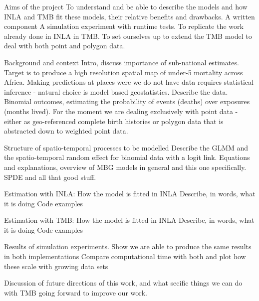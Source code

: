 \documentclass[12pt]{article}
\begin{document}
\maketitle

\begin{outline}[enumerate]
   \1 Aims of the project
      \2 To understand and be able to describe the models and how INLA and TMB fit these models, their relative benefits and drawbacks.
        \3 A written component
        \3 A simulation experiment with runtime tests. 
      \2 To replicate the work already done in INLA in TMB.
      \2 To set ourselves up to extend the TMB model to deal with both point and polygon data.
      
      
      
    \1 Background and context
      \2 Intro, discuss importance of sub-national estimates.
      \2 Target is to produce a high resolution spatial map of under-5 mortality across Africa. Making predictions at places were we do not have data requires statistical inference - natural choice is model based geostatistics.
      \2 Describe the data. Binomial outcomes, estimating the probability of events (deaths) over exposures (months lived). For the moment we are dealing exclusively with point data - either as geo-referenced complete birth histories or polygon data that is abstracted down to weighted point data. 
      
    \1 Structure of spatio-temporal processes to be modelled
      \2 Describe the GLMM and the spatio-temporal random effect for binomial data with a logit link.
      \2 Equations and explanations, overview of MBG models in general and this one specifically. SPDE and all that good stuff.
      
    \1 Estimation with INLA: How the model is fitted in INLA
      \2 Describe, in words, what it is doing
      \2 Code examples
      
    \1 Estimation with TMB: How the model is fitted in INLA
      \2 Describe, in words, what it is doing
      \2 Code examples
            

    \1 Results of simulation experiments.
      \2 Show we are able to produce the same results in both implementations
      \2 Compare computational time with both and plot how these scale with growing data sets
      
      
    \1 Discussion of future directions of this work, and what secific things we can do with TMB going forward to improve our work.
   
   
   
   
   
   
   
   
   
   
   
   
   
   
   
   
   
   
   
\end{outline}
\end{document}
